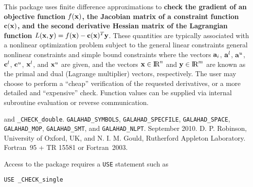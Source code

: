 \documentclass{galahad}
\newcommand{\packagename}{CHECK}
\newcommand{\fullpackagename}{\libraryname\_\packagename}
\begin{document}
\galheader


\galsummary
This package uses finite difference approximations to {\bf check the gradient of an objective
  function $f({\mathbf{x}})$, the Jacobian matrix of a constraint function ${\mathbf{c}}({\mathbf{x}})$, and the
  second derivative Hessian matrix of the Lagrangian function $L({\mathbf{x}},{\mathbf{y}}) = f({\mathbf{x}}) -
  {\mathbf{c}}({\mathbf{x}})^T {\mathbf{y}}$}.  These quantities are typically associated with a nonlinear
optimization problem
subject to the general linear constraints
general nonlinear constraints
and simple bound constraints
where the vectors ${\mathbf{a}}_{i}$, ${\mathbf{a}}^{l}$, ${\mathbf{a}}^{u}$, ${\mathbf{c}}^{l}$,
${\mathbf{c}}^{u}$, ${\mathbf{x}}^{l}$, and ${\mathbf{x}}^{u}$ are given, and the vectors
${\mathbf{x}}\in\hbox{I\hskip -1.5pt R}^n$ and ${\mathbf{y}}\in\hbox{I\hskip -1.5pt R}^m$ are known as the primal and dual (Lagrange
multiplier) vectors, respectively.  The user may choose to perform a ``cheap''
verification of the requested derivatives, or a more detailed
and ``expensive'' check.  Function values can be supplied via internal
subroutine evaluation or reverse communication.


\galattributes
\galversions{\tt  \fullpackagename\_single} and {\tt \fullpackagename\_double}.
\galuses 
{\tt GALAHAD\_SY\-M\-BOLS},
{\tt GAL\-AHAD\_SPECFILE},
{\tt GALAHAD\_SPACE},
{\tt GALAHAD\_MOP},
{\tt GALAHAD\_SMT}, and
{\tt GALAHAD\_NLPT}.
\galdate September 2010.
\galorigin D. P. Robinson, University of Oxford, UK, and
N. I. M. Gould, Rutherford Appleton Laboratory.
\gallanguage Fortran~95 + TR 15581 or Fortran~2003. 


\galhowto


Access to the package requires a {\tt USE} statement such as

\medskip{}

\hspace{8mm} {\tt USE \fullpackagename\_single}
\end{document}

